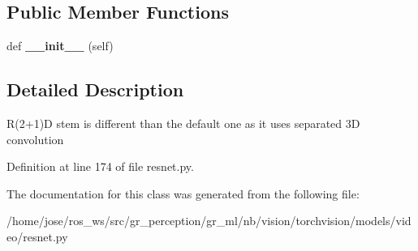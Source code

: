 \subsection*{Public Member Functions}
\begin{DoxyCompactItemize}
\item 
\mbox{\label{classtorchvision_1_1models_1_1video_1_1resnet_1_1R2Plus1dStem_a19c23a75f2f90b054b65a9b2218fa1aa}} 
def {\bfseries \+\_\+\+\_\+init\+\_\+\+\_\+} (self)
\end{DoxyCompactItemize}


\subsection{Detailed Description}
\begin{DoxyVerb}R(2+1)D stem is different than the default one as it uses separated 3D convolution
\end{DoxyVerb}
 

Definition at line 174 of file resnet.\+py.



The documentation for this class was generated from the following file\+:\begin{DoxyCompactItemize}
\item 
/home/jose/ros\+\_\+ws/src/gr\+\_\+perception/gr\+\_\+ml/nb/vision/torchvision/models/video/resnet.\+py\end{DoxyCompactItemize}
